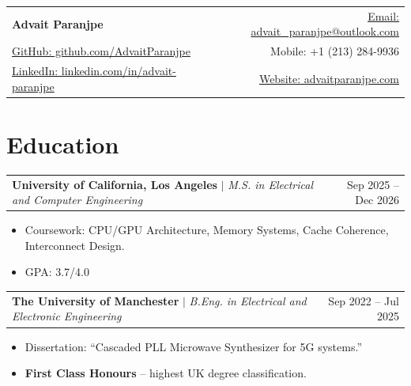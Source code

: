 \documentclass[10pt,letterpaper]{article}
\newcommand{\resumeItem}[1]{\item #1}
\newcommand{\resumeEduHeading}[3]{\begin{tabularx}{\textwidth}{X r}\textbf{#1} $\mid$ \textit{#2} & #3 \\\end{tabularx}\vspace{0pt}}
\newenvironment{resumeItemList}{\begin{small}\begin{itemize}[leftmargin=*, itemsep=2pt, topsep=3pt, parsep=0pt]}{\end{itemize}\end{small}\vspace{4pt}}
\begin{document}
\begin{tabularx}{\textwidth}{@{}X r@{}}
    {\fontsize{18}{28}\selectfont \textbf{Advait Paranjpe}} & \href{mailto:advait_paranjpe@outlook.com}{Email: advait\_paranjpe@outlook.com} \\[-1pt]
    \href{https://github.com/AdvaitParanjpe}{GitHub: github.com/AdvaitParanjpe} & Mobile: +1 (213) 284-9936 \\[-1pt]
    \href{https://linkedin.com/in/advait-paranjpe}{LinkedIn: linkedin.com/in/advait-paranjpe} & \href{https://advaitparanjpe.com}{Website: advaitparanjpe.com}
\end{tabularx}

\vspace{3pt}
\section*{Education}
\resumeEduHeading{University of California, Los Angeles}{M.S. in Electrical and Computer Engineering}{Sep 2025 -- Dec 2026}
\begin{resumeItemList}
    \resumeItem{Coursework: CPU/GPU Architecture, Memory Systems, Cache Coherence, Interconnect Design.}
    \resumeItem{GPA: 3.7/4.0}
\end{resumeItemList}
\resumeEduHeading{The University of Manchester}{B.Eng. in Electrical and Electronic Engineering}{Sep 2022 -- Jul 2025}
\begin{resumeItemList}
    \resumeItem{Dissertation: ``Cascaded PLL Microwave Synthesizer for 5G systems.''}
    \resumeItem{\textbf{First Class Honours} -- highest UK degree classification.}
\end{resumeItemList}
\end{document}
